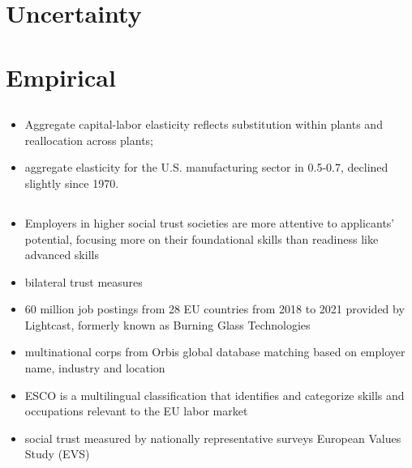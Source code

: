 \documentclass[10pt]{article} %
\begin{document}
    \subsection{\cite{KletteKortum2004}}

    \subsection{\cite{Melitz2003}}
\section{Uncertainty}
    \subsection{\cite{ArellanoBaiKehoe2019}}
\section{Empirical}

    \subsection{\cite{OberfieldRaval2021}}
    \begin{itemize}
        \item Aggregate capital-labor elasticity reflects substitution within plants and reallocation across plants;
        \item aggregate elasticity for the U.S. manufacturing sector in 0.5-0.7, declined slightly since 1970.
    \end{itemize}

    \subsection{\cite{ZhangWang2023}}
    \begin{itemize}
        \item Employers in higher social trust societies are more attentive to applicants' potential, focusing more on their foundational skills than readiness like advanced skills
        \item bilateral trust measures
        \item 60 million job postings from 28 EU countries from 2018 to 2021 provided by Lightcast, formerly known as Burning Glass Technologies
        \item multinational corps from Orbis global database matching based on employer name, industry and location
        \item ESCO is a multilingual classification that identifies and categorize skills and occupations relevant to the EU labor market
        \item social trust measured by nationally representative surveys European Values Study (EVS)
    \end{itemize}
\end{document}
